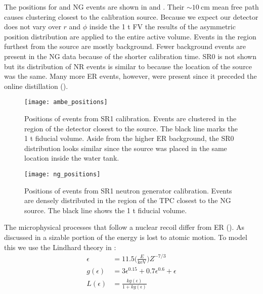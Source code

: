 The positions for \ambe and NG events are shown in  and
.  Their ${\sim}10\ \mathrm{cm}$ mean free path causes clustering
closest to the calibration source.  Because we expect our
detector does not vary over $r$ and $\phi$ inside the 1 t FV the results of the asymmetric position distribution are applied to the entire
active volume.  Events in the region furthest from the source are mostly background.  Fewer background events are present in the NG data
because of the shorter calibration time.  SR0 \ambe is not shown but its distribution of NR events is similar to
 because the location of the source was the same.  Many more ER events,
however, were present since it preceded the online distillation ().

\begin{figure}
\centering
\texttt{[image: ambe\_positions]}
\caption[Positions of events from SR1 \ambe calibration.  Events are clustered in the region of the detector closest to the \ambe
source.  The black line marks the 1 t fiducial volume.]{Positions of events from SR1 \ambe calibration.  Events are clustered in the region
of the detector closest to the \ambe
source.  The black line marks the 1 t fiducial volume.  Aside from the higher ER background, the SR0 distribution looks similar since the
source was placed in the same location inside the water tank.}
\label{fig:er_nr_calibrations_parameter_determ_nr_ambe_positions}
\end{figure}

\begin{figure}
\centering
\texttt{[image: ng\_positions]}
\caption{Positions of events from SR1 neutron generator calibration.  Events are densely distributed in the region of the TPC closest to
the NG source.  The black line shows the 1 t fiducial volume.}
\label{fig:er_nr_calibrations_parameter_determ_nr_ng_positions}
\end{figure}

The microphysical processes that follow a nuclear recoil differ from ER ().  As
discussed in  a sizable portion of the energy is lost to atomic motion.  To model this we use the Lindhard theory
in :
\begin{subequations}
\begin{align}
\epsilon &= 11.5 \bigg( \frac{E}{\mathrm{keV}} \bigg) Z^{-7/3} \\
g( \epsilon ) &= 3 \epsilon ^{0.15} + 0.7 \epsilon ^{0.6} + \epsilon \\
L( \epsilon ) &= \frac{k g( \epsilon ) }{1 + k g( \epsilon )}
\end{align}
\label{eq:er_nr_calibrations_parameter_determ_nr_lindhard}
\end{subequations}

